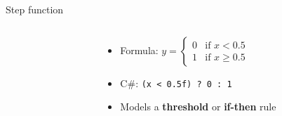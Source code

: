 \begin{frame}[fragile]{Step function}
    \begin{columns}
        \begin{column}{0.57\textwidth}
            \begin{center}
            \end{center}
        \end{column}
        \begin{column}{0.4\textwidth}
            \begin{itemize}
                \pause\item Formula: $y = \begin{cases}
                    0 &\text{if } x<0.5 \\
                    1 &\text{if } x \geq 0.5
                \end{cases}$
                \pause\item C\#: \lstinline{(x < 0.5f) ? 0 : 1}
                \pause\item Models a \textbf{threshold} or \textbf{if-then} rule
            \end{itemize}
        \end{column}
    \end{columns}
\end{frame}

